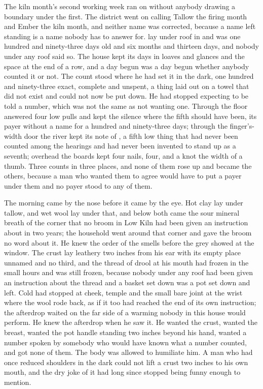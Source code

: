 
The kiln month's second working week ran on without anybody drawing a boundary under the first. The district went on calling Tallow the firing month and Ember the kiln month, and neither name was corrected, because a name left standing is a name nobody has to answer for.  lay under  roof in  and was one hundred and ninety-three days old and six months and thirteen days, and nobody under any roof said so. The house kept its days in loaves and glances and the space at the end of a row, and a day begun was a day begun whether anybody counted it or not. The count stood where he had set it in the dark, one hundred and ninety-three exact, complete and unspent, a thing laid out on a towel that did not exist and could not now be put down. He had stopped expecting to be told a number, which was not the same as not wanting one. Through the floor  answered four low pulls and kept the silence where the fifth should have been, its payer without a name for a hundred and ninety-three days; through the finger's-width door the river kept its note of , a fifth low thing that had never been counted among the hearings and had never been invented to stand up as a seventh; overhead the boards kept four nails, four, and a knot the width of a thumb. Three counts in three places, and none of them rose up and became the others, because a man who wanted them to agree would have to put a payer under them and no payer stood to any of them.

The morning came by the nose before it came by the eye. Hot clay lay under tallow, and wet wool lay under that, and below both came the sour mineral breath of the corner that no broom in Low Kiln had been given an instruction about in two years; the household went around that corner and gave the broom no word about it. He knew the order of the smells before the grey showed at the window. The crust lay leathery two inches from his ear with its empty place unnamed and no third, and the thread of drool at his mouth had frozen in the small hours and was still frozen, because nobody under any roof had been given an instruction about the thread and a basket set down was a pot set down and left. Cold had stopped at cheek, temple and the small bare joint at the wrist where the wool rode back, as if it too had reached the end of its own instruction; the afterdrop waited on the far side of a warming nobody in this house would perform. He knew the afterdrop when he saw it. He wanted the crust, wanted the breast, wanted the pot handle standing two inches beyond his hand, wanted a number spoken by somebody who would have known what a number counted, and got none of them. The body was allowed to humiliate him. A man who had once reduced shoulders in the dark could not lift a crust two inches to his own mouth, and the dry joke of it had long since stopped being funny enough to mention.

